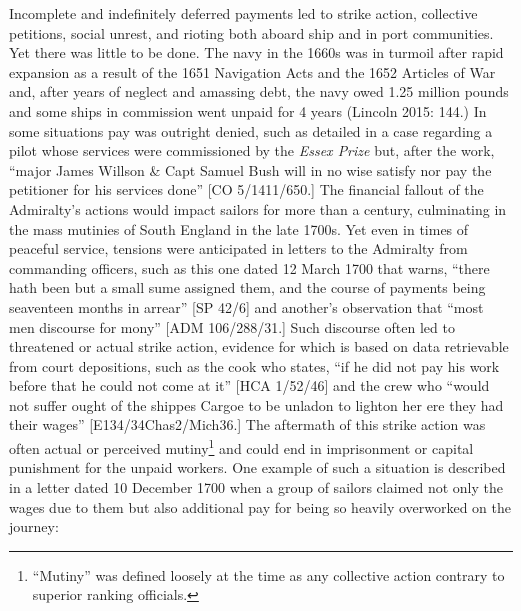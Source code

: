 \begin{styleStandard}
Incomplete and indefinitely deferred payments led to strike action, collective petitions, social unrest, and rioting both aboard ship and in port communities. Yet there was little to be done. The navy in the 1660s was in turmoil after rapid expansion as a result of the 1651 Navigation Acts and the 1652 Articles of War and, after years of neglect and amassing debt, the navy owed 1.25 million pounds and some ships in commission went unpaid for 4 years (Lincoln 2015: 144.) In some situations pay was outright denied, such as detailed in a case regarding a pilot whose services were commissioned by the \textit{Essex Prize} but, after the work, “major James Willson \& Capt Samuel Bush will in no wise satisfy nor pay the petitioner for his services done” [CO 5/1411/650.] The financial fallout of the Admiralty’s actions would impact sailors for more than a century, culminating in the mass mutinies of South England in the late 1700s. Yet even in times of peaceful service, tensions were anticipated in letters to the Admiralty from commanding officers, such as this one dated 12 March 1700 that warns, “there hath been but a small sume assigned them, and the course of payments being seaventeen months in arrear” [SP 42/6] and another’s observation that “most men discourse for mony” [ADM 106/288/31.] Such discourse often led to threatened or actual strike action, evidence for which is based on data retrievable from court depositions, such as the cook who states, “if he did not pay his work before that he could not come at it” [HCA 1/52/46] and the crew who “would not suffer ought of the shippes Cargoe to be unladon to lighton her ere they had their wages” [E134/34Chas2/Mich36.] The aftermath of this strike action was often actual or perceived mutiny\footnote{ “Mutiny” was defined loosely at the time as any collective action contrary to superior ranking officials.} and could end in imprisonment or capital punishment for the unpaid workers. One example of such a situation is described in a letter dated 10 December 1700 when a group of sailors claimed not only the wages due to them but also additional pay for being so heavily overworked on the journey:
\end{styleStandard}


